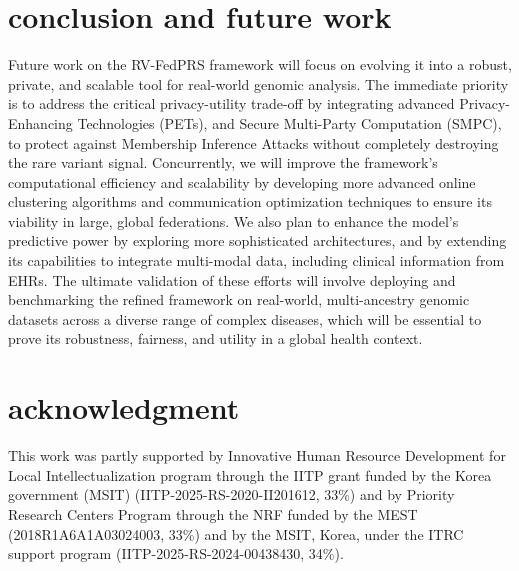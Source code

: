 \documentclass[conference]{IEEEtran}
\begin{document}
\section{conclusion and future work}
\label{conclude}
Future work on the RV-FedPRS framework will focus on evolving it into a robust, private, and scalable tool for real-world genomic analysis. The immediate priority is to address the critical privacy-utility trade-off by integrating advanced Privacy-Enhancing Technologies (PETs), and Secure Multi-Party Computation (SMPC), to protect against Membership Inference Attacks without completely destroying the rare variant signal. Concurrently, we will improve the framework's computational efficiency and scalability by developing more advanced online clustering algorithms and communication optimization techniques to ensure its viability in large, global federations. We also plan to enhance the model's predictive power by exploring more sophisticated architectures, and by extending its capabilities to integrate multi-modal data, including clinical information from EHRs. The ultimate validation of these efforts will involve deploying and benchmarking the refined framework on real-world, multi-ancestry genomic datasets across a diverse range of complex diseases, which will be essential to prove its robustness, fairness, and utility in a global health context.

\section *{acknowledgment}
\scriptsize
\vspace{-0.1cm}
This work was partly supported by Innovative Human Resource Development for Local Intellectualization program through the IITP grant funded by the Korea government (MSIT) (IITP-2025-RS-2020-II201612, 33\%) and by Priority Research Centers Program through the NRF funded by the MEST (2018R1A6A1A03024003, 33\%) and by the MSIT, Korea, under the ITRC support program (IITP-2025-RS-2024-00438430, 34\%).

\balance


\end{document}
